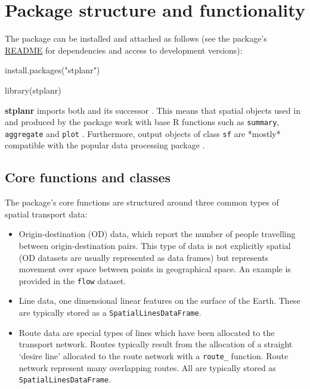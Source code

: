 \section{Package structure and
functionality}\label{package-structure-and-functionality}

The package can be installed and attached as follows (see the
package's \href{https://github.com/ropensci/stplanr}{README} for
dependencies and access to development versions):

\begin{Schunk}
\begin{Sinput}
install.packages("stplanr")
\end{Sinput}
\end{Schunk}

\begin{Schunk}
\begin{Sinput}
library(stplanr)
\end{Sinput}
\end{Schunk}

\textbf{stplanr} imports both  and its successor .
This means that spatial objects used in and produced by the package work with base R functions such as
\texttt{summary}, \texttt{aggregate} and \texttt{plot} \citep{bivand_applied_2013}.
Furthermore, output objects of class \texttt{sf} are *mostly* compatible with the popular data processing package .

\subsection{Core functions and
classes}\label{core-functions-and-classes}

The package's core functions are structured around three common types of
spatial transport data:

\begin{itemize}
\tightlist
\item
  Origin-destination (OD) data, which report the number of people
  travelling between origin-destination pairs. This type of data is not
  explicitly spatial (OD datasets are usually represented as data
  frames) but represents movement over space between points in
  geographical space. An example is provided in the \texttt{flow}
  dataset.
\item
  Line data, one dimensional linear features on the surface of the
  Earth. These are typically stored as a \texttt{SpatialLinesDataFrame}.
\item
  Route data are special types of lines which have been allocated to the
  transport network. Routes typically result from the allocation of a
  straight `desire line' allocated to the route network with a
  \texttt{route\_} function. Route network represent many overlapping
  routes. All are typically stored as \texttt{SpatialLinesDataFrame}.
\end{itemize}

